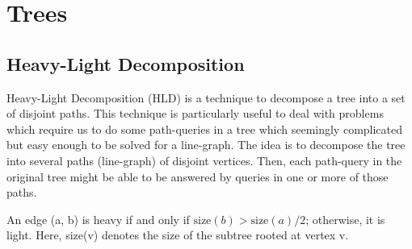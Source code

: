 \section{Trees}

\subsection{Heavy-Light Decomposition}
Heavy-Light Decomposition (HLD) is a technique to decompose a tree into a set of disjoint paths. This technique is particularly useful to deal with problems which require us to do some path-queries in a tree which seemingly complicated but easy enough to be solved for a line-graph. The idea is to decompose the tree into several paths (line-graph) of disjoint vertices. Then, each path-query in the original tree might be able to be answered by queries in one or more of those paths.

An edge (a, b) is heavy if and only if $\text{size}(b) > \text{size}(a)/2$; otherwise, it is light. Here, size(v) denotes the size of the subtree rooted at vertex v.
